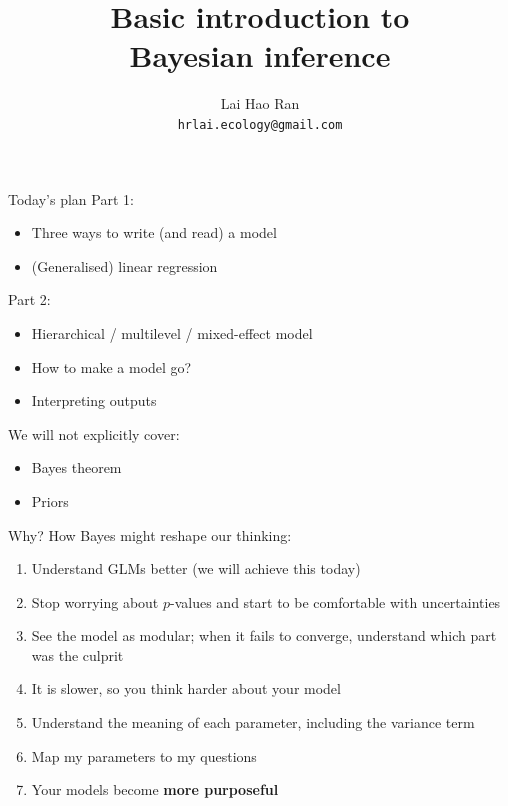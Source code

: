 \documentclass[12pt]{beamer}
\author{Lai Hao Ran \\ \footnotesize\texttt{hrlai.ecology@gmail.com}}
\title{Basic introduction to\\Bayesian inference}
\date{}
\begin{document}
\begin{frame}
\titlepage
\end{frame}

\begin{frame}{Today's plan}
Part 1:
\begin{itemize}
\item Three ways to write (and read) a model
\item (Generalised) linear regression
\end{itemize}
\pause
Part 2:
\begin{itemize}
\item Hierarchical / multilevel / mixed-effect model
\item How to make a model go?
\item Interpreting outputs
\end{itemize}
\vfill \pause
We will not explicitly cover:
\begin{itemize}
\item Bayes theorem 
\item Priors
\end{itemize}
\end{frame}

\begin{frame}{Why?}
\pause
How Bayes might reshape our thinking:
\begin{enumerate}[<+->]
\item Understand GLMs better (we will achieve this today)
\item Stop worrying about $p$-values and start to be comfortable with uncertainties
\item See the model as modular; when it fails to converge, understand which part was the culprit
\item It is slower, so you think harder about your model
\item Understand the meaning of each parameter, including the variance term
\item Map my parameters to my questions
\item Your models become \textbf{more purposeful}
\end{enumerate}
\end{frame}
\end{document}
